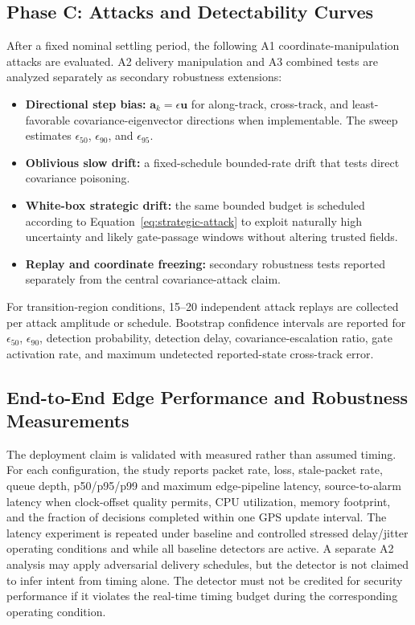 \documentclass[11pt,a4paper]{article}
\begin{document}
\subsection{Phase C: Attacks and Detectability Curves}
After a fixed nominal settling period, the following A1 coordinate-manipulation attacks are evaluated. A2 delivery manipulation and A3 combined tests are analyzed separately as secondary robustness extensions:
\begin{itemize}
    \item \textbf{Directional step bias:} $\mathbf{a}_k=\epsilon\mathbf{u}$ for along-track, cross-track, and least-favorable covariance-eigenvector directions when implementable. The sweep estimates $\epsilon_{50}$, $\epsilon_{90}$, and $\epsilon_{95}$.
    \item \textbf{Oblivious slow drift:} a fixed-schedule bounded-rate drift that tests direct covariance poisoning.
    \item \textbf{White-box strategic drift:} the same bounded budget is scheduled according to Equation~\eqref{eq:strategic-attack} to exploit naturally high uncertainty and likely gate-passage windows without altering trusted fields.
    \item \textbf{Replay and coordinate freezing:} secondary robustness tests reported separately from the central covariance-attack claim.
\end{itemize}
For transition-region conditions, 15--20 independent attack replays are collected per attack amplitude or schedule. Bootstrap confidence intervals are reported for $\epsilon_{50}$, $\epsilon_{90}$, detection probability, detection delay, covariance-escalation ratio, gate activation rate, and maximum undetected reported-state cross-track error.

\subsection{End-to-End Edge Performance and Robustness Measurements}
The deployment claim is validated with measured rather than assumed timing. For each configuration, the study reports packet rate, loss, stale-packet rate, queue depth, p50/p95/p99 and maximum edge-pipeline latency, source-to-alarm latency when clock-offset quality permits, CPU utilization, memory footprint, and the fraction of decisions completed within one GPS update interval. The latency experiment is repeated under baseline and controlled stressed delay/jitter operating conditions and while all baseline detectors are active. A separate A2 analysis may apply adversarial delivery schedules, but the detector is not claimed to infer intent from timing alone. The detector must not be credited for security performance if it violates the real-time timing budget during the corresponding operating condition.
\end{document}
